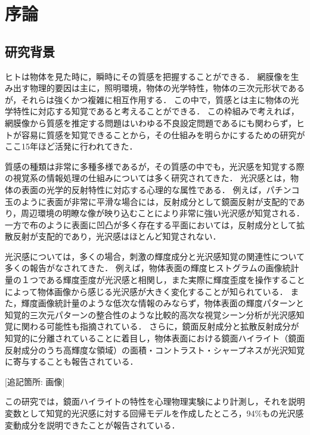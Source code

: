 \chapter{序論}
    \section{研究背景}
        ヒトは物体を見た時に，瞬時にその質感を把握することができる．
        網膜像を生み出す物理的要因は主に，照明環境，物体の光学特性，物体の三次元形状であるが，それらは強くかつ複雑に相互作用する．
        この中で，質感とは主に物体の光学特性に対応する知覚であると考えることができる．
        この枠組みで考えれば，網膜像から質感を推定する問題はいわゆる不良設定問題であるにも関わらず，ヒトが容易に質感を知覚できることから，その仕組みを明らかにするための研究がここ15年ほど活発に行われてきた．

        質感の種類は非常に多種多様であるが\cite{Material}，その質感の中でも，光沢感を知覚する際の視覚系の情報処理の仕組みについては多く研究されてきた．
        光沢感とは，物体の表面の光学的反射特性に対応する心理的な属性である．
        例えば，パチンコ玉のように表面が非常に平滑な場合には，反射成分として鏡面反射が支配的であり，周辺環境の明瞭な像が映り込むことにより非常に強い光沢感が知覚される．
        一方で布のように表面に凹凸が多く存在する平面においては，反射成分として拡散反射が支配的であり，光沢感はほとんど知覚されない．

        光沢感については，多くの場合，刺激の輝度成分と光沢感知覚の関連性について多くの報告がなされてきた．
        例えば，物体表面の輝度ヒストグラムの画像統計量の１つである輝度歪度が光沢感と相関し，また実際に輝度歪度を操作することによって物体画像から感じる光沢感が大きく変化することが知られている\cite{Motoyoshi}．
        また，輝度画像統計量のような低次な情報のみならず，物体表面の輝度パターンと知覚的三次元パターンの整合性のような比較的高次な視覚シーン分析が光沢感知覚に関わる可能性も指摘されている\cite{Marlow1}．
        さらに，鏡面反射成分と拡散反射成分が知覚的に分離されていることに着目し，物体表面における鏡面ハイライト（鏡面反射成分のうち高輝度な領域）の面積・コントラスト・シャープネスが光沢知覚に寄与することも報告されている\cite{Marlow2}．
        
        [追記箇所: 画像]
        
        この研究では，鏡面ハイライトの特性を心理物理実験により計測し，それを説明変数として知覚的光沢感に対する回帰モデルを作成したところ，94\%もの光沢感変動成分を説明できたことが報告されている．

